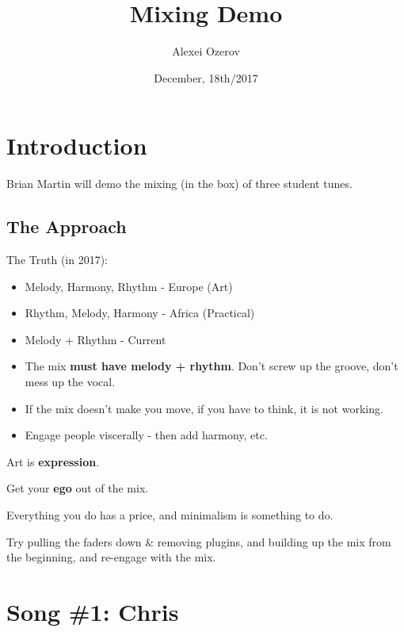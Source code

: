 \documentclass{article}
\title{Mixing Demo}
\author{Alexei Ozerov}
\date{December, 18th/2017}
\begin{document}
\maketitle
\tableofcontents

\section{Introduction}

Brian Martin will demo the mixing (in the box) of three student tunes.

\subsection{The Approach}

The Truth (in 2017):

\medskip

\begin{itemize}
\item Melody, Harmony, Rhythm - Europe (Art)
\item Rhythm, Melody, Harmony - Africa (Practical)
\item Melody + Rhythm - Current
\item The mix \textbf{must have melody + rhythm}. Don't screw up the groove, don't mess up the vocal.
\item If the mix doesn't make you move, if you have to think, it is not working.
\item Engage people viscerally - then add harmony, etc.
\end{itemize}

\medskip

Art is \textbf{expression}.

\medskip

Get your \textbf{ego} out of the mix.

\medskip

Everything you do has a price, and minimalism is something to do.

\medskip

Try pulling the faders down \& removing plugins, and building up the mix from the beginning, and re-engage with the mix.

\section{Song \#1: Chris}
\end{document}
